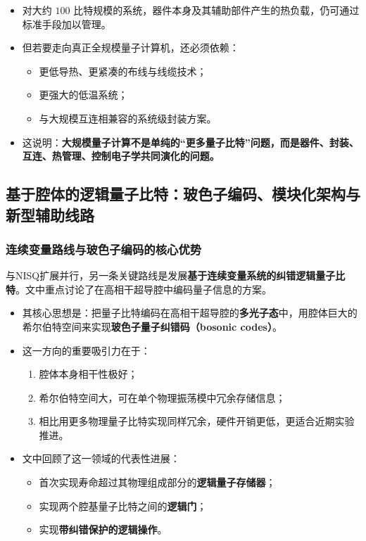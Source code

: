 \documentclass[12pt,a4paper,oneside]{ctexbook}
\begin{document}
\begin{itemize}
    \item 对大约 \(100\) 比特规模的系统，器件本身及其辅助部件产生的热负载，仍可通过标准手段加以管理。
    
    \item 但若要走向真正全规模量子计算机，还必须依赖：
    \begin{itemize}
        \item 更低导热、更紧凑的布线与线缆技术；
        \item 更强大的低温系统；
        \item 与大规模互连相兼容的系统级封装方案。
    \end{itemize}
    
    \item 这说明：\textbf{大规模量子计算不是单纯的“更多量子比特”问题，而是器件、封装、互连、热管理、控制电子学共同演化的问题。}
\end{itemize}

\subsection{基于腔体的逻辑量子比特：玻色子编码、模块化架构与新型辅助线路}

\subsubsection{连续变量路线与玻色子编码的核心优势}

与NISQ扩展并行，另一条关键路线是发展\textbf{基于连续变量系统的纠错逻辑量子比特}。文中重点讨论了在高相干超导腔中编码量子信息的方案。

\begin{itemize}
    \item 其核心思想是：把量子比特编码在高相干超导腔的\textbf{多光子态}中，用腔体巨大的希尔伯特空间来实现\textbf{玻色子量子纠错码（bosonic codes）}。
    
    \item 这一方向的重要吸引力在于：
    \begin{enumerate}
        \item 腔体本身相干性极好；
        \item 希尔伯特空间大，可在单个物理振荡模中冗余存储信息；
        \item 相比用更多物理量子比特实现同样冗余，硬件开销更低，更适合近期实验推进。
    \end{enumerate}
    
    \item 文中回顾了这一领域的代表性进展：
    \begin{itemize}
        \item 首次实现寿命超过其物理组成部分的\textbf{逻辑量子存储器}；
        \item 实现两个腔基量子比特之间的\textbf{逻辑门}；
        \item 实现\textbf{带纠错保护的逻辑操作}。
    \end{itemize}
\end{itemize}
\end{document}
